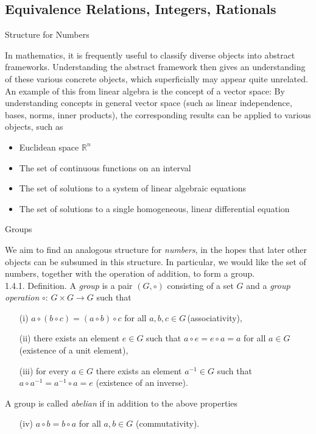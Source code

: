 \documentclass[smaller,hyperref={CJKbookmarks=true}]{beamer}
\newcommand{\R}{\mathbb{R}}
\begin{document}
\subsection{Equivalence Relations, Integers, Rationals}
\begin{frame}[c] \begin{spacing}{2}
\tableofcontents[sectionstyle=hide,subsectionstyle=show/shaded/hide]
\end{spacing}
\end{frame}
\begin{frame}[t]{Structure for Numbers}
\begin{spacing}{1.1}
In mathematics, it is frequently useful to classify diverse objects into
abstract frameworks. Understanding the abstract framework then gives an
understanding of these various concrete objects, which superficially may
appear quite unrelated.\\[6pt]
An example of this from linear algebra is the concept of a vector space: By
understanding concepts in general vector space (such as linear
independence, bases, norms, inner products), the corresponding results can
be applied to various objects, such as
\begin{itemize}
  \item Euclidean space $\R^n$
  \item The set of continuous functions on an interval
  \item The set of solutions to a system of linear algebraic equations
  \item The set of solutions to a single homogeneous, linear differential equation
\end{itemize}
\end{spacing}
\end{frame}
\begin{frame}[t]{Groups}
\begin{spacing}{1.1}
We aim to find an analogous structure for \emph{numbers}, in the hopes that later
other objects can be subsumed in this structure. In particular, we would
like the set of numbers, together with the operation of addition, to form a
group.\\[5pt]
\alert{1.4.1. Definition.} A \emph{group} is a pair $(G,\circ)$ consisting of a set $G$ and a \emph{group operation} $\circ\!:\,G\times G\to G$ such that
\begin{itemize}
  \item[(i)] $a\circ(b\circ c)=(a\circ b)\circ c$ for all $a,b,c\in G$\,\alert{(associativity)},
  \item[(ii)] there exists an element $e\in G$ such that $a\circ e=e\circ a=a$ for all $a\in G$ \alert{(existence of a unit element)},
  \item[(iii)] for every $a\in G$ there exists an element $a^{-1}\in G$ such that $a\circ a^{-1}=a^{-1}\circ a=e$ \alert{(existence of an inverse)}.
\end{itemize}
A group is called \emph{abelian} if in addition to the above properties
\begin{itemize}
  \item[(iv)] $a\circ b=b\circ a$ for all $a,b\in G$ \alert{(commutativity)}.
\end{itemize}
\end{spacing}
\end{frame}
\end{document}
